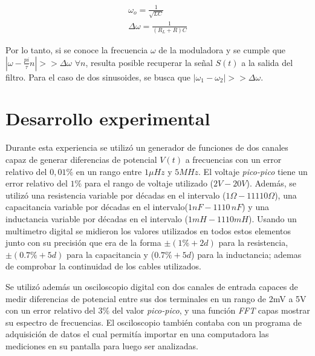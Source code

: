 \documentclass[11pt,a4paper]{article}
\begin{document}
\begin{equation}
\begin{split}
\omega_o = \frac{1}{\sqrt{LC}}\\
\Delta\omega = \frac{1}{(R_L+R)C}
\end{split}
\label{eq:antiresonante}
\end{equation}

Por lo tanto, si se conoce la frecuencia $\omega$ de la moduladora y se cumple que $|\omega-\frac{pi}{\tau}n|>> \Delta\omega$ $\forall n$, resulta posible recuperar la señal $S(t)$ a la salida del filtro. Para el caso de dos sinusoides, se busca que $|\omega_1-\omega_2|>> \Delta\omega$.



\section{Desarrollo experimental}
Durante esta experiencia se utilizó un generador de funciones de dos canales capaz de generar diferencias de potencial $V(t)$ a frecuencias con un error relativo del $0,01\%$ en un rango entre $1\mu Hz$ y $5MHz$. El voltaje \textit{pico-pico} tiene un error relativo del $1\%$ para el rango de voltaje utilizado ($2V-20V$). Además, se utilizó una resistencia variable por décadas en el intervalo ($1\Omega-11110\Omega$), una capacitancia variable por décadas en el intervalo($1nF-1110\,nF$) y una inductancia variable por décadas en el intervalo ($1mH-1110mH$). Usando un multimetro digital se midieron los valores utilizados en todos estos elementos junto con su precisión que era de la forma $\pm(1\%+2d)$ para la resistencia, $\pm(0.7\%+5d)$ para la capacitancia y ($0.7\% +5d$) para la inductancia; ademas de comprobar la continuidad de los cables utilizados.

Se utilizó además un osciloscopio digital con dos canales de entrada capaces de medir diferencias de potencial entre sus dos terminales en un rango de 2mV a 5V con un error relativo del $3\%$ del valor \textit{pico-pico}, y una función \textit{FFT} capas mostrar su espectro de frecuencias. El osciloscopio también contaba con un programa de adquisición de datos el cual permitía importar en una computadora las mediciones en su pantalla para luego ser analizadas. 
\end{document}
